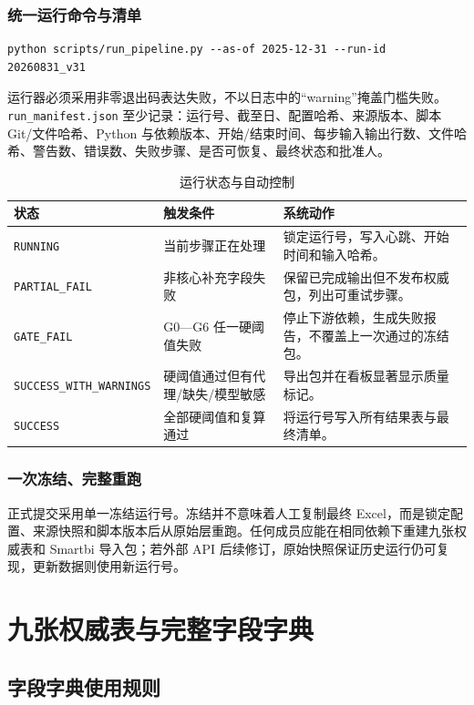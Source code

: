 \documentclass[UTF8,fontset=windows,12pt,openany]{ctexbook}
\newcommand{\Field}[1]{{\small\nolinkurl{#1}}}
\newcommand{\File}[1]{{\small\nolinkurl{#1}}}
\begin{document}
\section{统一运行命令与清单}

\begin{verbatim}
python scripts/run_pipeline.py --as-of 2025-12-31 --run-id 20260831_v31
\end{verbatim}

运行器必须采用非零退出码表达失败，不以日志中的“warning”掩盖门槛失败。\File{run_manifest.json} 至少记录：运行号、截至日、配置哈希、来源版本、脚本 Git/文件哈希、Python 与依赖版本、开始/结束时间、每步输入输出行数、文件哈希、警告数、错误数、失败步骤、是否可恢复、最终状态和批准人。

\begin{longtable}{p{3.5cm}p{4.2cm}p{5.7cm}}
\caption{运行状态与自动控制}\label{tab:run-status}\\
\toprule
\textbf{状态} & \textbf{触发条件} & \textbf{系统动作}\\
\midrule
\Field{RUNNING} & 当前步骤正在处理 & 锁定运行号，写入心跳、开始时间和输入哈希。\\
\Field{PARTIAL_FAIL} & 非核心补充字段失败 & 保留已完成输出但不发布权威包，列出可重试步骤。\\
\Field{GATE_FAIL} & G0—G6 任一硬阈值失败 & 停止下游依赖，生成失败报告，不覆盖上一次通过的冻结包。\\
\Field{SUCCESS_WITH_WARNINGS} & 硬阈值通过但有代理/缺失/模型敏感 & 导出包并在看板显著显示质量标记。\\
\Field{SUCCESS} & 全部硬阈值和复算通过 & 将运行号写入所有结果表与最终清单。\\
\bottomrule
\end{longtable}

\section{一次冻结、完整重跑}

正式提交采用单一冻结运行号。冻结并不意味着人工复制最终 Excel，而是锁定配置、来源快照和脚本版本后从原始层重跑。任何成员应能在相同依赖下重建九张权威表和 Smartbi 导入包；若外部 API 后续修订，原始快照保证历史运行仍可复现，更新数据则使用新运行号。

\part{九张权威表与完整字段字典}

\chapter{字段字典使用规则}
\end{document}
